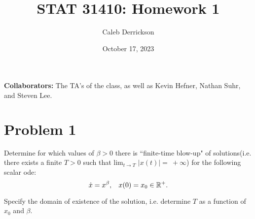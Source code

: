 

\title{STAT 31410: Homework 1}
\author{Caleb Derrickson}
\date{October 17, 2023}


\onehalfspacing
\maketitle

{\color{cit}\vspace{2mm}\noindent\textbf{Collaborators:}} The TA's of the class, as well as Kevin Hefner, Nathan Suhr, and Steven Lee.

\tableofcontents

\newpage

\section{Problem 1}
Determine for which values of $\beta > 0$ there is ``finite-time blow-up" of solutions(i.e. there exists a finite $T > 0$ such that lim$_{t \rightarrow T}$ $\lvert x(t) \rvert = \ + \infty$) for the following scalar ode:
\[
\dot{x} = x^\beta, \hspace{3mm} x(0) = x_0 \in \mathbb{R}^+.
\]

Specify the domain of existence of the solution, i.e. determine $T$ as a function of $x_0$ and $\beta$.

